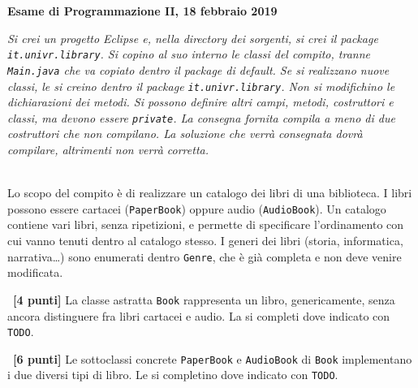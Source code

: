 \documentclass[12pt]{article}
\newcounter{esnu}
\newenvironment{esercizio}{\medskip \noindent {\bf Esercizio\addtocounter{esnu}{1} \arabic{esnu}}}{}
\begin{document}
\begin{center} {\bf Esame di Programmazione II, 18 febbraio 2019}\end{center}

\emph{
Si crei un progetto Eclipse e, nella directory dei sorgenti,
si crei il package \texttt{it.univr.library}. Si copino al suo interno
le classi del compito, tranne \texttt{Main.java} che va copiato
dentro il package di default.
Se si realizzano nuove classi, le si creino dentro
il package \texttt{it.univr.library}.
Non si modifichino le dichiarazioni dei metodi. Si possono definire altri campi,
metodi, costruttori e classi, ma devono essere \texttt{private}.
La consegna fornita compila a meno di due costruttori che non
compilano.
La soluzione che verr\`a consegnata dovr\`a compilare,
altrimenti non verr\`a corretta.
}

\mbox{}\\

Lo scopo del compito \`e di realizzare un catalogo dei libri di una
biblioteca. I libri possono essere cartacei
(\texttt{PaperBook}) oppure audio (\texttt{AudioBook}).
Un catalogo contiene vari libri, senza ripetizioni, e permette di specificare
l'ordinamento con cui vanno tenuti dentro al catalogo stesso.
I generi dei libri (storia, informatica, narrativa\ldots)
sono enumerati dentro \texttt{Genre}, che \`e gi\`a completa
e non deve venire modificata.

\begin{esercizio}~\textbf{[4 punti]}
  La classe astratta \texttt{Book} rappresenta un libro, genericamente,
  senza ancora distinguere fra libri cartacei e audio.
  La si completi dove indicato con \texttt{TODO}.
\end{esercizio}

\begin{esercizio}~\textbf{[6 punti]}
  Le sottoclassi concrete \texttt{PaperBook} e \texttt{AudioBook}
  di \texttt{Book} implementano i due diversi tipi di libro.
  Le si completino dove indicato con \texttt{TODO}.
\end{esercizio}
\end{document}
